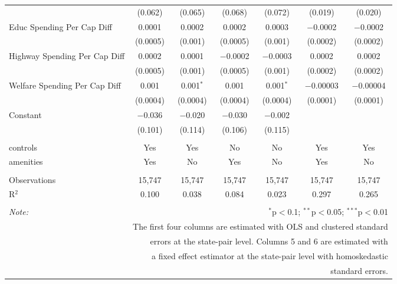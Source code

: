 \begin{table}[!htbp]
\begin{tabular}{@{\extracolsep{5pt}}lcccccc}
  & (0.062) & (0.065) & (0.068) & (0.072) & (0.019) & (0.020) \\ 
  Educ Spending Per Cap Diff & 0.0001 & 0.0002 & 0.0002 & 0.0003 & $-$0.0002 & $-$0.0002 \\ 
  & (0.0005) & (0.001) & (0.0005) & (0.001) & (0.0002) & (0.0002) \\ 
  Highway Spending Per Cap Diff & 0.0002 & 0.0001 & $-$0.0002 & $-$0.0003 & 0.0002 & 0.0002 \\ 
  & (0.0005) & (0.001) & (0.0005) & (0.001) & (0.0002) & (0.0002) \\ 
  Welfare Spending Per Cap Diff & 0.001 & 0.001$^{*}$ & 0.001 & 0.001$^{*}$ & $-$0.00003 & $-$0.00004 \\ 
  & (0.0004) & (0.0004) & (0.0004) & (0.0004) & (0.0001) & (0.0001) \\ 
  Constant & $-$0.036 & $-$0.020 & $-$0.030 & $-$0.002 &  &  \\ 
  & (0.101) & (0.114) & (0.106) & (0.115) &  &  \\ 
 \hline \\[-1.8ex] 
controls & Yes & Yes & No & No & Yes & Yes \\ 
amenities & Yes & No & Yes & No & Yes & No \\ 
\hline \\[-1.8ex] 
Observations & 15,747 & 15,747 & 15,747 & 15,747 & 15,747 & 15,747 \\ 
R$^{2}$ & 0.100 & 0.038 & 0.084 & 0.023 & 0.297 & 0.265 \\ 
\hline 
\hline \\[-1.8ex] 
\textit{Note:}  & \multicolumn{6}{r}{$^{*}$p$<$0.1; $^{**}$p$<$0.05; $^{***}$p$<$0.01} \\ 
 & \multicolumn{6}{r}{The first four columns are estimated with OLS and clustered standard} \\ 
 & \multicolumn{6}{r}{ errors at the state-pair level. Columns 5 and 6 are estimated with} \\ 
 & \multicolumn{6}{r}{a fixed effect estimator at the state-pair level with homoskedastic} \\ 
 & \multicolumn{6}{r}{standard errors.} \\ 
\end{tabular} 
\end{table} 
